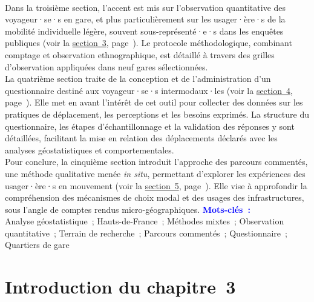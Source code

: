 \begin{refsegment}
\begin{tcolorbox}
{    \\
Dans la troisième section, l’accent est mis sur l’observation quantitative des voyageur·se·s en gare, et plus particulièrement sur les usager·ère·s de la mobilité individuelle légère, souvent sous-représenté·e·s dans les enquêtes publiques (voir la \hyperref[chap3:observation-quantitative]{section~3}, page~\pageref{chap3:observation-quantitative}). Le protocole méthodologique, combinant comptage et observation ethnographique, est détaillé à travers des grilles d’observation appliquées dans neuf gares sélectionnées.%
    \\
La quatrième section traite de la conception et de l’administration d’un questionnaire destiné aux voyageur·se·s intermodaux·les (voir la \hyperref[chap3:questionnaire]{section~4}, page~\pageref{chap3:questionnaire}). Elle met en avant l’intérêt de cet outil pour collecter des données sur les pratiques de déplacement, les perceptions et les besoins exprimés. La structure du questionnaire, les étapes d’échantillonnage et la validation des réponses y sont détaillées, facilitant la mise en relation des déplacements déclarés avec les analyses géostatistiques et comportementales.%
    \\
Pour conclure, la cinquième section introduit l’approche des parcours commentés, une méthode qualitative menée \textsl{in situ}, permettant d’explorer les expériences des usager·ère·s en mouvement (voir la \hyperref[chap3:parcours-commente]{section~5}, page~\pageref{chap3:parcours-commente}). Elle vise à approfondir la compréhension des mécanismes de choix modal et des usages des infrastructures, sous l'angle de comptes rendus micro-géographiques.%
    }
    \tcblower
\Large{\textcolor{blue}{\textbf{Mots-clés~:}}}
    \\
    \small{
Analyse géostatistique~;
Hauts-de-France~;
Méthodes mixtes~;
Observation quantitative~;
Terrain de recherche~;
Parcours commentés~;
Questionnaire~;
Quartiers de gare
    }
    \end{tcolorbox}

    \newpage
\section*{Introduction du chapitre~3
    \label{chap3:introduction}
    }


\end{refsegment}

